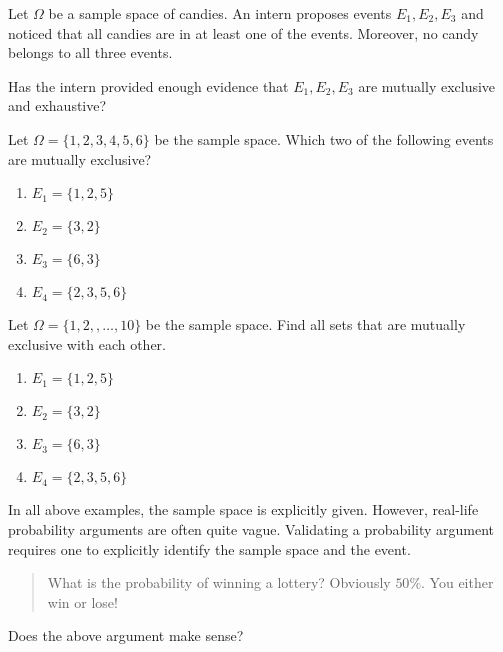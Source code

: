 \documentclass[../main.tex]{subfiles}
\begin{document}
\begin{example}
  Let \(\Omega\) be a sample space of candies.  An intern proposes events \(E_{1}, E_{2}, E_{3}\) and noticed that all candies are in at least one of the events.  Moreover, no candy belongs to all three events.  

  Has the intern provided enough evidence that \(E_{1}, E_{2}, E_{3}\) are mutually exclusive and exhaustive?

\end{example}

\begin{example}
  Let \(\Omega = \{1,2,3,4,5,6\}\) be the sample space. Which two of the following events are mutually exclusive?

  \begin{enumerate}[label=(\alph*)]
    \item \(E_{1} = \{1,2,5\}\)
    \item \(E_{2} = \{3,2\}\)
    \item \(E_{3} = \{6,3\}\)
    \item \(E_{4} = \{2,3,5,6\}\)
  \end{enumerate}
\end{example}

\begin{example}
  Let \(\Omega = \{1,2,,\ldots,10\}\) be the sample space. Find all sets that are mutually exclusive with each other.

  \begin{enumerate}[label=(\alph*)]
    \item \(E_{1} = \{1,2,5\}\)
    \item \(E_{2} = \{3,2\}\)
    \item \(E_{3} = \{6,3\}\)
    \item \(E_{4} = \{2,3,5,6\}\)
  \end{enumerate}
\end{example}

\begin{example}
  In all above examples, the sample space is explicitly given. However, real-life probability arguments are often quite vague. Validating a probability argument requires one to explicitly identify the sample space and the event.  

  \begin{quote}
    What is the probability of winning a lottery? Obviously \(50\%\). You either win or lose!
  \end{quote}

  Does the above argument make sense? 
\end{example}
\end{document}

